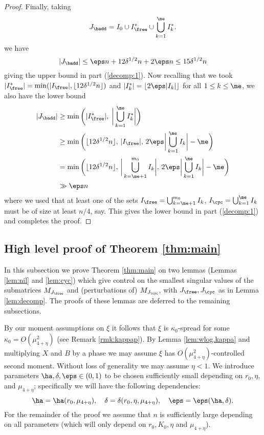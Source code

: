 \documentclass[aop,preprint]{imsart}
\theoremstyle{plain}
\theoremstyle{definition}
\theoremstyle{remark}
\numberwithin{equation}{section}
\numberwithin{theorem}{section}
\def \lf {\lfloor}
\def \rf {\rfloor}
\begin{document}
\begin{proof}
Finally, taking
\begin{equation}
J_{\badd} = I_0 \cup I_{\free}^* \cup \bigcup_{k=1}^{\me } I_k^*.
\end{equation}
we have 
\[
|J_{\badd}| \le \eps n + 12\delta^{1/2}n + 2\eps n \le 15 \delta^{1/2}n
\]
giving the upper bound in part (\ref{decomp:1}).
Now recalling that we took 
$|I_{\free}^*|= \min(|I_{\free}|, \lf 12 \delta^{1/2}n\rf)$
%
and $|I_k^*| = \lf 2\eps |I_k|\rf$ for all $1\le k\le \me $, we also have the lower bound
\begin{align*}
|J_{\badd}|
&\ge \min\bigg(|I_{\free}^*|, \; \bigg|\bigcup_{k=1}^{\me } I_k^*\bigg| \bigg)  \\
&\ge \min\bigg(  \lf 12\delta^{1/2}n\rf ,\, |I_{\free}|,\, 2\eps \bigg| \bigcup_{k=1}^{\me } I_k \bigg| - \me \bigg)\\
&= \min \bigg( \lf 12 \delta^{1/2}n\rf, \, \bigg| \bigcup_{k=\me +1}^{m_0} I_k \bigg| , \,
2\eps \bigg| \bigcup_{k=1}^{\me } I_k \bigg| - \me \bigg) \\
&\gg \eps n
\end{align*}
where we used that at least one of the sets $I_{\free} = \bigcup_{k=\me +1}^{m_0} I_k$, $I_{\cyc} = \bigcup_{k=1}^{\me } I_k$ must be of size at least $n/4$, say.
This gives the lower bound in part (\ref{decomp:1}) and completes the proof.
\end{proof}


\subsection{High level proof of Theorem \ref{thm:main}}	\label{sec:highlevel}

In this subsection we prove Theorem \ref{thm:main} on two lemmas (Lemmas \ref{lem:nil} and \ref{lem:cyc}) which give control on the smallest singular values of the submatrices $M_{J_{\free}}$ and (perturbations of) $M_{J_{\cyc}}$, with $J_{\free}, J_{\cyc}$ as in Lemma \ref{lem:decomp}.
The proofs of these lemmas are deferred to the remaining subsections.

By our moment assumptions on $\xi$ it follows that $\xi$ is $\kappa_0$-spread for some $\kappa_0=O(\mu_{4+\eta}^2)$ (see Remark \ref{rmk:kappap}).
By Lemma \ref{lem:wlog.kappa} and multiplying $X$ and $B$ by a phase we may assume $\xi$ has $O(\mu_{4+\eta}^2)$-controlled second moment.
Without loss of generality we may assume $\eta<1$.
We introduce parameters $\ha,\delta,\eps\in (0,1)$ to be chosen sufficiently small depending on $r_0,\eta$, and $\mu_{4+\eta}$; specifically we will have the following dependencies:
\begin{equation}	\label{depends}
\ha=\ha(r_0,\mu_{4+\eta}), \quad \delta=\delta(r_0,\eta,\mu_{4+\eta}), \quad \eps=\eps(\ha,\delta).
\end{equation}
For the remainder of the proof we assume that $n$ is sufficiently large depending on all parameters (which will only depend on $r_0,K_0, \eta$ and $\mu_{4+\eta}$). 
\end{document}
